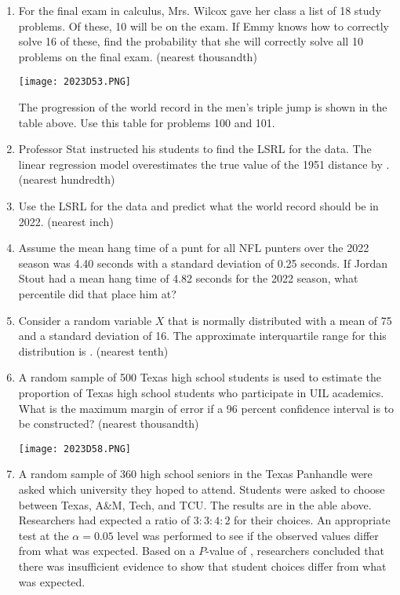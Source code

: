 \documentclass[../uilmath.tex]{subfiles}
\begin{document}
\begin{enumerate}[label=\bfseries\arabic*.]
    \item %
    For the final exam in calculus, Mrs. Wilcox gave her class a list of 18 study problems. Of these, 10 will be on the exam. If Emmy knows how to correctly solve 16 of these,
    find the probability that she will correctly solve all 10 problems on the final exam. (nearest thousandth)

    \begin{center}
        \texttt{[image: 2023D53.PNG]}
    \end{center}
    The progression of the world record in the men's triple jump is shown in the table above. Use this table for problems 100 and 101.
    \item %
    Professor Stat instructed his students to find the LSRL for the data. The linear regression model overestimates the true value of the 1951 distance by \blank . (nearest hundredth)

    \item %
    Use the LSRL for the data and predict what the world record should be in 2022. (nearest inch)

    \item %
    Assume the mean hang time of a punt for all NFL punters over the 2022 season was 4.40 seconds with a standard deviation of 0.25 seconds. 
    If Jordan Stout had a mean hang time of 4.82 seconds for the 2022 season, what percentile did that place him at?

    \item %
    Consider a random variable $X$ that is normally distributed with a mean of 75 and a standard deviation of 16.
    The approximate interquartile range for this distribution is \blank . (nearest tenth)

    \item %
    A random sample of 500 Texas high school students is used to estimate the proportion of Texas high school students who participate in UIL academics.
    What is the maximum margin of error if a 96 percent confidence interval is to be constructed? (nearest thousandth)

    \begin{center}
        \texttt{[image: 2023D58.PNG]}
    \end{center}
    \item %
    A random sample of 360 high school seniors in the Texas Panhandle were asked which university they hoped to attend.
    Students were asked to choose between Texas, A\&M, Tech, and TCU. The results are in the able above. Researchers had expected a ratio of $3:3:4:2$ for their choices.
    An appropriate test at the $\alpha = 0.05$ level was performed to see if the observed values differ from what was expected. Based on a $P$-value of \blank, researchers concluded that 
    there was insufficient evidence to show that student choices differ from what was expected.


\end{enumerate}
\end{document}
